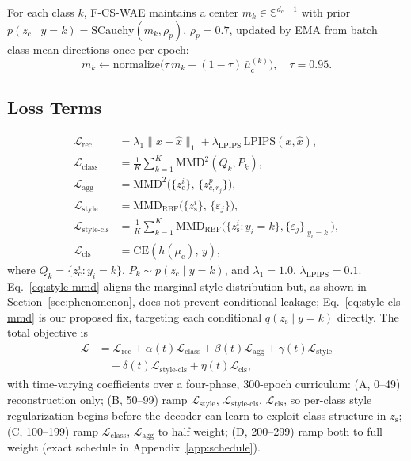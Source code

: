 \documentclass[10pt,letterpaper]{article}
\newcommand{\ours}{F-CS-WAE}
\newcommand{\zc}{z_{\mathrm{c}}}
\newcommand{\zs}{z_{\mathrm{s}}}
\newcommand{\muc}{\mu_{\mathrm{c}}}
\newcommand{\Sph}{\mathbb{S}}
\newcommand{\MMD}{\mathrm{MMD}}
\newcommand{\CE}{\mathrm{CE}}
\newcommand{\SCauchy}{\mathrm{SCauchy}}
\begin{document}
For each class $k$, \ours{} maintains a center $m_k\in\Sph^{d_c-1}$ with
prior $p(\zc\mid y{=}k)=\SCauchy(m_k,\rho_p)$, $\rho_p=0.7$, updated by EMA
from batch class-mean directions once per epoch:
\begin{equation}
  m_k \leftarrow \mathrm{normalize}\!\bigl(\tau\,m_k + (1-\tau)\,\bar\muc^{(k)}\bigr),
  \quad \tau=0.95.
\end{equation}

\subsection{Loss Terms}
\label{sec:losses}

\begin{align}
  \mathcal{L}_{\mathrm{rec}} &= \lambda_1\|x-\hat{x}\|_1 + \lambda_{\mathrm{LPIPS}}\,\mathrm{LPIPS}(x,\hat{x}), \\
  \mathcal{L}_{\mathrm{class}} &= \frac{1}{K}\sum_{k=1}^{K}\MMD^2(Q_k,P_k), \\
  \mathcal{L}_{\mathrm{agg}} &= \MMD^2\!\bigl(\{\zc^i\},\,\{z_{c,r_j}^p\}\bigr), \\
  \mathcal{L}_{\mathrm{style}} &= \MMD_{\mathrm{RBF}}\!\bigl(\{\zs^i\},\,\{\varepsilon_j\}\bigr), \label{eq:style-mmd}\\
  \mathcal{L}_{\mathrm{style\text{-}cls}} &= \frac{1}{K}\sum_{k=1}^{K}
    \MMD_{\mathrm{RBF}}\!\bigl(\{\zs^i{:}y_i{=}k\},\{\varepsilon_j\}_{|y_i=k|}\bigr), \label{eq:style-cls-mmd}\\
  \mathcal{L}_{\mathrm{cls}} &= \CE(h(\muc),\,y),
\end{align}
where $Q_k=\{\zc^i:y_i=k\}$, $P_k\sim p(\zc\mid y{=}k)$, and
$\lambda_1{=}1.0$, $\lambda_{\mathrm{LPIPS}}{=}0.1$.
Eq.~\ref{eq:style-mmd} aligns the marginal style distribution but, as shown
in Section~\ref{sec:phenomenon}, does not prevent conditional leakage;
Eq.~\ref{eq:style-cls-mmd} is our proposed fix, targeting each conditional
$q(\zs\mid y{=}k)$ directly. The total objective is
\begin{align}
  \mathcal{L} &= \mathcal{L}_{\mathrm{rec}} + \alpha(t)\mathcal{L}_{\mathrm{class}}
   + \beta(t)\mathcal{L}_{\mathrm{agg}} + \gamma(t)\mathcal{L}_{\mathrm{style}} \nonumber\\
  &\quad + \delta(t)\mathcal{L}_{\mathrm{style\text{-}cls}} + \eta(t)\mathcal{L}_{\mathrm{cls}},
  \label{eq:total}
\end{align}
with time-varying coefficients over a four-phase, 300-epoch curriculum:
(A, 0--49) reconstruction only; (B, 50--99) ramp $\mathcal{L}_{\mathrm{style}}$,
$\mathcal{L}_{\mathrm{style\text{-}cls}}$, $\mathcal{L}_{\mathrm{cls}}$, so
per-class style regularization begins before the decoder can learn to exploit
class structure in $\zs$; (C, 100--199) ramp $\mathcal{L}_{\mathrm{class}}$,
$\mathcal{L}_{\mathrm{agg}}$ to half weight; (D, 200--299) ramp both to full
weight (exact schedule in Appendix~\ref{app:schedule}).
\end{document}
